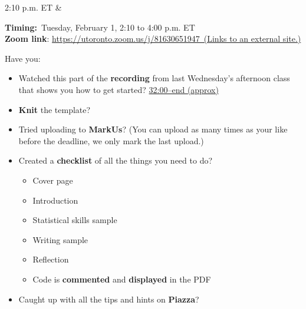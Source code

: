 \documentclass[
  openany]{book}
\begin{document}
\begin{longtable}[]
2:10 p.m. ET & \begin{minipage}[t]{\linewidth}\raggedright
\textbf{Timing:}~Tuesday, February 1, 2:10 to 4:00 p.m. ET\\
\textbf{Zoom link}: \href{https://utoronto.zoom.us/j/81630651947}{https://utoronto.zoom.us/j/81630651947~(Links to an external site.)}

Have you:

\begin{itemize}
\item
  Watched this part of the \textbf{recording} from last Wednesday's afternoon class that shows you how to get started? \href{https://utoronto.zoom.us/rec/play/W68vOICdNSWKd8LE8BNMd7SKXVth8qGfz18byH70zdrDVxwGVPTgF0XH2u4lxDWiIgB2UDSZ0IFJX_w.j33pUts5E42G2SXf}{32:00--end (approx)}
\item
  \textbf{Knit} the template?
\item
  Tried uploading to \textbf{MarkUs}? (You can upload as many times as your like before the deadline, we only mark the last upload.)
\item
  Created a \textbf{checklist} of all the things you need to do?

  \begin{itemize}
  \item
    Cover page
  \item
    Introduction
  \item
    Statistical skills sample
  \item
    Writing sample
  \item
    Reflection
  \item
    Code is \textbf{commented} and \textbf{displayed} in the PDF
  \end{itemize}
\item
  Caught up with all the tips and hints on \textbf{Piazza}?


\end{itemize}
\end{minipage}
\end{longtable}
\end{document}
